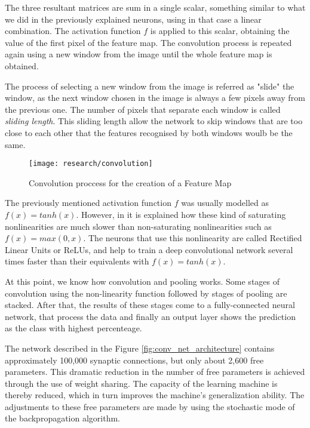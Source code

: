 The three resultant matrices are sum in a single scalar, something similar to what we did in the previously explained neurons, using in that case a linear combination. The activation function $f$ is applied to this scalar, obtaining the value of the first pixel of the feature map. The convolution process is repeated again using a new window from the image until the whole feature map is obtained. 

The process of selecting a new window from the image is referred as "slide" the window, as the next window chosen in the image is always a few pixels away from the previous one. The number of pixels that separate each window is called \textit{sliding length}. This sliding length allow the network to skip windows that are too close to each other that the features recognised by both windows woulb be the same.

\begin{figure}[!ht]
	\centering
	\texttt{[image: research/convolution]}
	\caption{Convolution proccess for the creation of a Feature Map}
	\label{fig:convol_creation_feature_map}
\end{figure}

The previously mentioned activation function $f$ was usually modelled as $f(x)=tanh(x)$. However, in \cite{krizhevsky2012deep} it is explained how these kind of saturating nonlinearities are much slower than non-saturating nonlinearities such as $f(x)=max(0, x)$. The neurons that use this nonlinearity are called Rectified Linear Units or ReLUs, and help to train a deep convolutional network several times faster than their equivalents with $f(x)=tanh(x)$.

At this point, we know how convolution and pooling works. Some stages of convolution using the non-linearity function followed by stages of pooling are stacked. After that, the results of these stages come to a fully-connected neural network, that process the data and finally an output layer shows the prediction as the class with highest percenteage.

The network described in the Figure \ref{fig:conv_net_architecture} contains approximately 100,000 synaptic connections, but only about 2,600 free parameters. This dramatic reduction in the number of free parameters is achieved through the use of weight sharing. The capacity of the learning machine is thereby reduced, which in turn improves the machine’s generalization ability. The adjustments to these free parameters are made by using the stochastic mode of the backpropagation algorithm.


